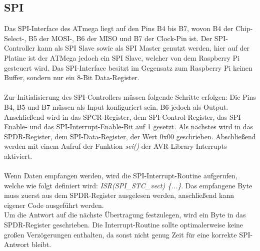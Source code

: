 \documentclass[12pt]{article}
\begin{document}
\subsection{SPI}
Das SPI-Interface des ATmega liegt auf den Pins B4 bis B7, wovon B4 der Chip-Select-, B5 der MOSI-, B6 der MISO und B7 der Clock-Pin ist. Der SPI-Controller kann als SPI Slave sowie als SPI Master genutzt werden, hier auf der Platine ist der ATMega jedoch ein SPI Slave, welcher von dem Raspberry Pi gesteuert wird. Das SPI-Interface besitzt im Gegensatz zum Raspberry Pi keinen Buffer, sondern nur ein 8-Bit Data-Register.
\\\\Zur Initialisierung des SPI-Controllers müssen folgende Schritte erfolgen: Die Pins B4, B5 und B7 müssen als Input konfiguriert sein, B6 jedoch als Output. Anschließend wird in das SPCR-Register, dem SPI-Control-Register, das SPI-Enable- und das SPI-Interrupt-Enable-Bit auf 1 gesetzt. Als nächstes wird in das SPDR-Register, dem SPI-Data-Register, der Wert 0x00 geschrieben. Abschließend werden mit einem Aufruf der Funktion \textit{sei()} der AVR-Library Interrupts aktiviert.
\\\\Wenn Daten empfangen werden, wird die SPI-Interrupt-Routine aufgerufen, welche wie folgt definiert wird: \textit{ISR(SPI\_STC\_vect) \{...\}}. Das empfangene Byte muss zuerst aus dem SPDR-Register ausgelesen werden, anschließend kann eigener Code ausgeführt werden.\\
Um die Antwort auf die nächste Übertragung festzulegen, wird ein Byte in das SPDR-Register geschrieben. Die Interrupt-Routine sollte optimalerweise keine großen Verzögerungen enthalten, da sonst nicht genug Zeit für eine korrekte SPI-Antwort bleibt.
\end{document}
